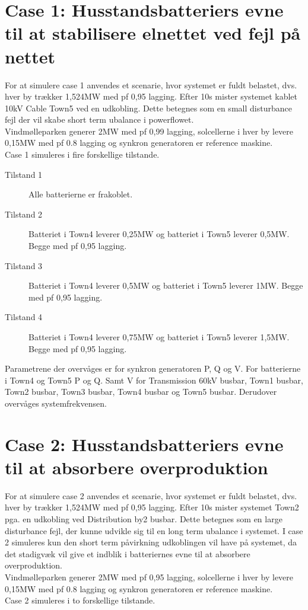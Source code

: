 
\label{Simulering}

\section{Case 1: Husstandsbatteriers evne til at stabilisere elnettet ved fejl på nettet}
\label{SimCase1}
For at simulere case 1 anvendes et scenarie, hvor systemet er fuldt belastet, dvs. hver by trækker 1,524MW med pf 0,95 lagging. Efter 10s mister systemet kablet 10kV Cable Town5 ved en udkobling. Dette betegnes som en small disturbance fejl der vil skabe short term ubalance i powerflowet.\\
Vindmølleparken generer 2MW med pf 0,99 lagging, solcellerne i hver by levere 0,15MW med pf 0.8 lagging og synkron generatoren er reference maskine.\\
Case 1 simuleres i fire forskellige tilstande.

\begin{description}
	\item[Tilstand 1] Alle batterierne er frakoblet.
	\item[Tilstand 2] Batteriet i Town4 leverer 0,25MW og batteriet i Town5 leverer 0,5MW. Begge med pf 0,95 lagging.
	\item[Tilstand 3] Batteriet i Town4 leverer 0,5MW og batteriet i Town5 leverer 1MW. Begge med pf 0,95 lagging.
	\item[Tilstand 4] Batteriet i Town4 leverer 0,75MW og batteriet i Town5 leverer 1,5MW. Begge med pf 0,95 lagging.
\end{description}

Parametrene der overvåges er for synkron generatoren P, Q og V.
For batterierne i Town4 og Town5 P og Q. Samt V for Transmission 60kV busbar, Town1 busbar, Town2 busbar, Town3 busbar, Town4 busbar og Town5 busbar.
Derudover overvåges systemfrekvensen.

\section{Case 2: Husstandsbatteriers evne til at absorbere overproduktion}
For at simulere case 2 anvendes et scenarie, hvor systemet er fuldt belastet, dvs. hver by trækker 1,524MW med pf 0,95 lagging. Efter 10s mister systemet Town2 pga. en udkobling ved Distribution by2 busbar. Dette betegnes som en large disturbance fejl, der kunne udvikle sig til en long term ubalance i systemet. I case 2 simuleres kun den short term påvirkning udkoblingen vil have på systemet, da det stadigvæk vil give et indblik i batteriernes evne til at absorbere overproduktion.\\
Vindmølleparken generer 2MW med pf 0,95 lagging, solcellerne i hver by levere 0,15MW med pf 0.8 lagging og synkron generatoren er reference maskine.\\
Case 2 simuleres i to forskellige tilstande.

